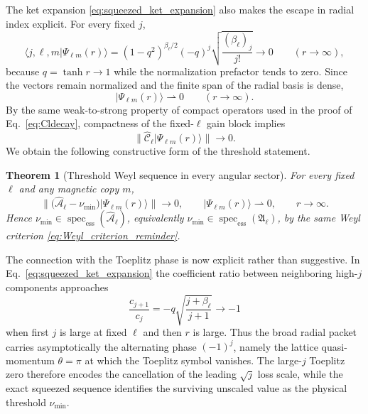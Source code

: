 \documentclass[11pt]{article}
\numberwithin{equation}{section}
\newcommand{\specess}{\operatorname{spec}_{\mathrm{ess}}}
\newtheorem{theorem}{Theorem}[section]
\theoremstyle{definition}
\begin{document}
The ket expansion \eqref{eq:squeezed_ket_expansion} also makes the escape in
radial index explicit.  For every fixed $j$,
\begin{equation}
 \langle j,\ell,m|\Psi_{\ell m}(r)\rangle
 =(1-q^2)^{\beta_\ell/2}
 (-q)^j\sqrt{\frac{(\beta_\ell)_j}{j!}}
 \longrightarrow0
 \qquad(r\to\infty),
\end{equation}
because $q=\tanh r\to1$ while the normalization prefactor tends to zero.
Since the vectors remain normalized and the finite span of the radial basis is
dense,
\begin{equation}
 |\Psi_{\ell m}(r)\rangle\rightharpoonup0
 \qquad(r\to\infty).
 \label{eq:weyl_weak}
\end{equation}
By the same weak-to-strong property of compact operators used in the proof of
Eq.~\eqref{eq:Cldecay}, compactness of the fixed-$\ell$ gain block implies
\begin{equation}
 \|\widehat{\mathcal C}_\ell|\Psi_{\ell m}(r)\rangle\|
 \longrightarrow0.
 \label{eq:weyl_gain}
\end{equation}
We obtain the following constructive form of the threshold statement.

\begin{theorem}[Threshold Weyl sequence in every angular sector]\label{thm:threshold_fixed_l}
For every fixed $\ell$ and any magnetic copy $m$,
\begin{equation}
 \boxed{
 \|\bigl(\widehat{\mathcal A}_\ell-\nu_{\min}\bigr)
 |\Psi_{\ell m}(r)\rangle\|
 \longrightarrow0,
 \qquad
 |\Psi_{\ell m}(r)\rangle\rightharpoonup0,
 \qquad r\to\infty.
 }
 \label{eq:threshold_Weyl_sequence}
\end{equation}
Hence $\nu_{\min}\in\specess(\widehat{\mathcal A}_\ell)$, equivalently
$\nu_{\min}\in\specess(\mathfrak A_\ell)$, by the same Weyl criterion
\eqref{eq:Weyl_criterion_reminder}.
\end{theorem}

The connection with the Toeplitz phase is now explicit rather than
suggestive.  In Eq.~\eqref{eq:squeezed_ket_expansion} the coefficient ratio
between neighboring high-$j$ components approaches
\begin{equation}
 \frac{c_{j+1}}{c_j}
 =-q\sqrt{\frac{j+\beta_\ell}{j+1}}
 \longrightarrow-1
\end{equation}
when first $j$ is large at fixed $\ell$ and then $r$ is large.  Thus the broad
radial packet carries asymptotically the alternating phase $(-1)^j$, namely
the lattice quasi-momentum $\theta=\pi$ at which the Toeplitz symbol
vanishes.  The large-$j$ Toeplitz zero therefore encodes the cancellation of
the leading $\sqrt j$ loss scale, while the exact squeezed sequence identifies
the surviving unscaled value as the physical threshold $\nu_{\min}$.
\end{document}
